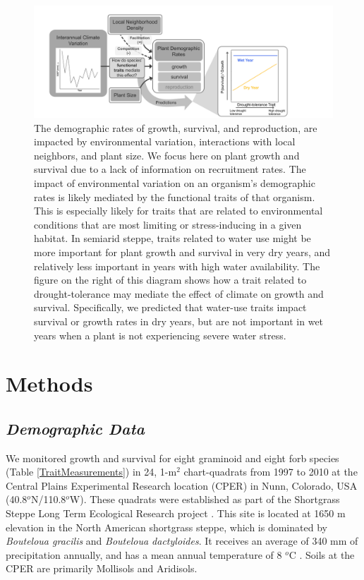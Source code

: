 \documentclass[12pt, letterpaper]{article}
\begin{document}
\begin{figure}
\includegraphics[width=1\textwidth]{CO_sgs_ConceptualFigure.pdf}
\caption{\small{
The demographic rates of growth, survival, and reproduction, are impacted by environmental variation, interactions with local neighbors, and plant size. We focus here on plant growth and survival due to a lack of information on recruitment rates. The impact of environmental variation on an organism's demographic rates is likely mediated by the functional traits of that organism. This is especially likely for traits that are related to environmental conditions that are most limiting or stress-inducing in a given habitat. In semiarid steppe, traits related to water use might be more important for plant growth and survival in very dry years, and relatively less important in years with high water availability. The figure on the right of this diagram shows how a trait related to drought-tolerance may mediate the effect of climate on growth and survival. Specifically, we predicted that water-use traits impact survival or growth rates in dry years, but are not important in wet years when a plant is not experiencing severe water stress. 
}}
\label{fig:ConceptFig}
\end{figure}

\section{Methods}
\subsection{\textit{Demographic Data}} We monitored growth and survival for eight graminoid and eight forb species (Table \ref{TraitMeasurements}) in 24, 1-m$^2$ chart-quadrats from 1997 to 2010 at the Central Plains Experimental Research location (CPER) in Nunn, Colorado, USA (40.8$^o$N/110.8$^o$W). These quadrats were established as part of the Shortgrass Steppe Long Term Ecological Research project \citep{Chu2013}. This site is located at 1650 m elevation in the North American shortgrass steppe, which is dominated by \textit{Bouteloua gracilis} and \textit{Bouteloua dactyloides}. It receives an average of 340 mm of precipitation annually, and has a mean annual temperature of 8 $^o$C \citep{Chu2014}. Soils at the CPER are primarily Mollisols and Aridisols.
\end{document}
